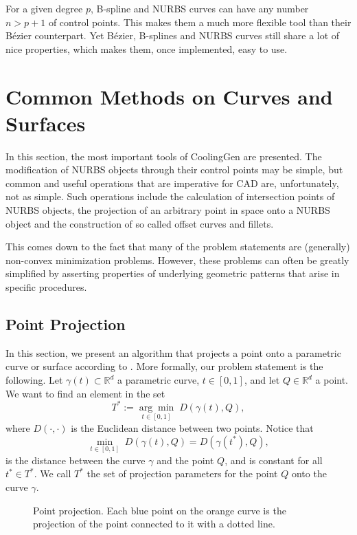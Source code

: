 \documentclass[a4paper, 11pt]{report}
\theoremstyle{definition}
\begin{document}
	For a given degree $p$, B-spline and NURBS curves can have any number $n > p+1$ of control points. This makes them a much more flexible tool than their Bézier counterpart. Yet Bézier, B-splines and NURBS curves still share a lot of nice properties, which makes them, once implemented, easy to use.

\section{Common Methods on Curves and Surfaces}
	In this section, the most important tools of CoolingGen are presented. The modification of NURBS objects through their control points may be simple, but common and useful operations that are imperative for CAD are, unfortunately, not as simple. Such operations include the calculation of intersection points of NURBS objects, the projection of an arbitrary point in space onto a NURBS object and the construction of so called offset curves and fillets.

	This comes down to the fact that many of the problem statements are (generally) non-convex minimization problems. However, these problems can often be greatly simplified by asserting properties of underlying geometric patterns that arise in specific procedures.

\subsection{Point Projection}\label{subsec:pointproj}
	In this section, we present an algorithm that projects a point onto a parametric curve or surface according to \cite{Piegl1997}. More formally, our problem statement is the following. Let $\gamma(t) \subset \mathbb{R}^d$ a parametric curve, $t \in [0,1]$, and let $Q \in \mathbb{R}^d$ a point. We want to find an element in the set
		$$T^* := \underset{t\in[0,1]}{\arg\min} \; D(\gamma(t), Q), $$
	where $D(\cdot, \cdot)$ is the Euclidean distance between two points. Notice that 
		$$\underset{t\in[0,1]}{\min} \; D(\gamma(t), Q) = D(\gamma(t^*), Q), $$
	is the distance between the curve $\gamma$ and the point $Q$, and is constant for all $t^* \in T^*$. We call $T^*$ the set of projection parameters for the point $Q$ onto the curve $\gamma$.

	\begin{figure}[H]
		\centering
		
		\caption{Point projection. Each blue point on the orange curve is the projection of the point connected to it with a dotted line.}
		\label{fig:pointinversion}
	\end{figure}
\end{document}
